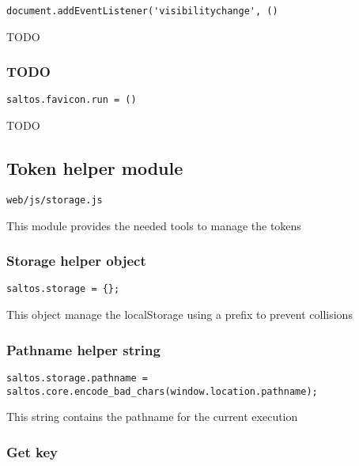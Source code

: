 \documentclass[a4paper]{article}
\begin{document}
\begin{lstlisting}
document.addEventListener('visibilitychange', ()
\end{lstlisting}

TODO

\hypertarget{toc843}{}
\subsubsection{TODO}

\begin{lstlisting}
saltos.favicon.run = ()
\end{lstlisting}

TODO

\hypertarget{toc844}{}
\subsection{Token helper module}

\begin{lstlisting}
web/js/storage.js
\end{lstlisting}

This module provides the needed tools to manage the tokens

\hypertarget{toc845}{}
\subsubsection{Storage helper object}

\begin{lstlisting}
saltos.storage = {};
\end{lstlisting}

This object manage the localStorage using a prefix to prevent collisions

\hypertarget{toc846}{}
\subsubsection{Pathname helper string}

\begin{lstlisting}
saltos.storage.pathname = saltos.core.encode_bad_chars(window.location.pathname);
\end{lstlisting}

This string contains the pathname for the current execution

\hypertarget{toc847}{}
\subsubsection{Get key}
\end{document}
